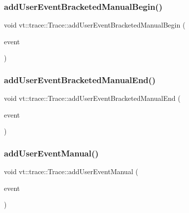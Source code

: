 \subsubsection{\texorpdfstring{add\+User\+Event\+Bracketed\+Manual\+Begin()}{addUserEventBracketedManualBegin()}}
{\footnotesize\ttfamily void vt\+::trace\+::\+Trace\+::add\+User\+Event\+Bracketed\+Manual\+Begin (\begin{DoxyParamCaption}\item[{\hyperlink{namespacevt_1_1trace_a70c43e0e1596eea236912d4197d3120a}{User\+Spec\+Event\+I\+D\+Type}}]{event }\end{DoxyParamCaption})}

\mbox{\label{structvt_1_1trace_1_1_trace_a5de97038ac60bfcdf868c3f32637ef9e}} 
\subsubsection{\texorpdfstring{add\+User\+Event\+Bracketed\+Manual\+End()}{addUserEventBracketedManualEnd()}}
{\footnotesize\ttfamily void vt\+::trace\+::\+Trace\+::add\+User\+Event\+Bracketed\+Manual\+End (\begin{DoxyParamCaption}\item[{\hyperlink{namespacevt_1_1trace_a70c43e0e1596eea236912d4197d3120a}{User\+Spec\+Event\+I\+D\+Type}}]{event }\end{DoxyParamCaption})}

\mbox{\label{structvt_1_1trace_1_1_trace_a2d9fac6bd71ba67e4f87b7efd7c6c6c7}} 
\subsubsection{\texorpdfstring{add\+User\+Event\+Manual()}{addUserEventManual()}}
{\footnotesize\ttfamily void vt\+::trace\+::\+Trace\+::add\+User\+Event\+Manual (\begin{DoxyParamCaption}\item[{\hyperlink{namespacevt_1_1trace_a70c43e0e1596eea236912d4197d3120a}{User\+Spec\+Event\+I\+D\+Type}}]{event }\end{DoxyParamCaption})}


